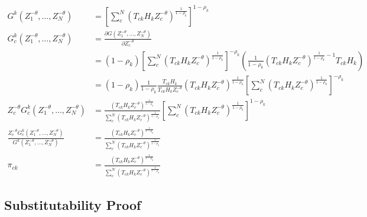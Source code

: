 \documentclass[10pt]{article}
\begin{document}
\begin{align*}
    G^k (Z_1^{-\theta}, \dots, Z_N^{-\theta})                                                                    & =  [\sum_{c}^{N} (T_{ck} H_k Z_c^{-\theta})^{\frac{1}{1 - \rho_k}}]^{1 - \rho_k}                                                                                                                                 \\
    G_c^k (Z_1^{-\theta}, \dots, Z_N^{-\theta})                                                                  & = \frac{\partial G(Z_1^{-\theta}, \dots, Z_N^{-\theta})}{\partial Z_c^{-\theta}}                                                                                                                                 \\
                                                                                                                 & = (1 - \rho_k)[\sum_{c}^{N} (T_{ck} H_k Z_c^{- \theta})^{\frac{1}{1 - \rho_k}}]^{- \rho_k} (\frac{1}{1 - \rho_k} (T_{ck} H_k Z_c^{- \theta})^{\frac{1}{1 - \rho_k} - 1} T_{ck} H_k)                              \\
                                                                                                                 & = (1 - \rho_k) \frac{1}{1 - \rho_k} \frac{T_{ck} H_k}{T_{ck} H_k Z_c^{- \theta}} (T_{ck} H_k Z_c^{- \theta})^{\frac{1}{1 - \rho_k}} [\sum_{c}^{N} (T_{ck} H_k Z_c^{- \theta})^{\frac{1}{1 - \rho_k}}]^{- \rho_k} \\
    Z_c^{- \theta} G_c^k (Z_1^{-\theta}, \dots, Z_N^{-\theta})                                                   & = \frac{(T_{ck} H_k Z_c^{-\theta})^{\frac{1}{1 - \rho_k}}}{\sum_{c}^{N} (T_{ck} H_k Z_c^{-\theta})^{\frac{1}{1 - \rho_k}}} [\sum_{c}^{N} (T_{ck} H_k Z_c^{-\theta})^{\frac{1}{1 - \rho_k}}]^{1 - \rho_k}         \\
    \frac{Z_c^{- \theta} G_c^k (Z_1^{-\theta}, \dots, Z_N^{-\theta})}{G^k (Z_1^{-\theta}, \dots, Z_N^{-\theta})} & = \frac{(T_{ck} H_k Z_c^{-\theta})^{\frac{1}{1 - \rho_k}}}{\sum_{c}^{N} (T_{ck} H_k Z_c^{-\theta})^{\frac{1}{1 - \rho_k}}}                                                                                       \\
    \pi_{ck}                                                                                                     & = \frac{(T_{ck} H_k Z_c^{-\theta})^{\frac{1}{1 - \rho_k}}}{\sum_{c}^{N} (T_{ck} H_k Z_c^{-\theta})^{\frac{1}{1 - \rho_k}}}
\end{align*}

\subsection{Substitutability Proof}
\end{document}
